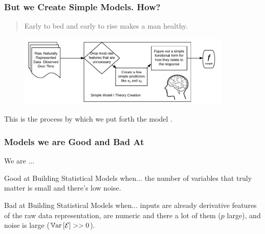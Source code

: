 \documentclass[handout]{beamer}
\begin{document}
\begin{frame}\frametitle{But we Create Simple Models. How?}

\begin{quotation}
Early to bed and early to rise makes a man healthy.
\end{quotation}

\begin{figure}
\centering
\includegraphics[width=4in]{human_simple_model_learning}
\end{figure}

This is the process by which we put forth the model .

\end{frame}


\begin{frame}\frametitle{Models we are Good and Bad At}
\small

We are ...

\begin{block}{Good at Building Statistical Models when...}
the number of variables that truly matter is small and there's low noise. %
\end{block}
	
\begin{block}{Bad at Building Statistical Models when...}
inputs are already derivative features of the raw data representation, are numeric and there a lot of them ($p$ large), and noise is large ($\mathbb{V}\text{ar}\left[\mathcal{E}\right] >> 0$). %
\end{block}


\end{frame}
\end{document}
